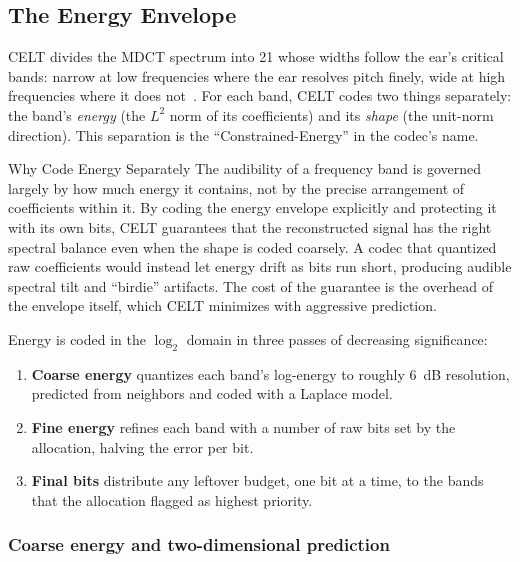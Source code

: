 \subsection{The Energy Envelope}\label{subsec:celt_energy}

CELT divides the MDCT spectrum into 21  whose widths follow the
ear's critical bands: narrow at low frequencies where the ear resolves pitch
finely, wide at high frequencies where it does not~\cite{zwicker1999psychoacoustics}.
For each band, CELT codes two things separately: the band's \emph{energy} (the
$L^2$ norm of its coefficients) and its \emph{shape} (the unit-norm direction).
This separation is the ``Constrained-Energy'' in the codec's name.

\begin{concept}{Why Code Energy Separately}
  The audibility of a frequency band is governed largely by how much energy it
  contains, not by the precise arrangement of coefficients within it. By coding
  the energy envelope explicitly and protecting it with its own bits, CELT
  guarantees that the reconstructed signal has the right spectral balance even
  when the shape is coded coarsely. A codec that quantized raw coefficients would
  instead let energy drift as bits run short, producing audible spectral tilt and
  ``birdie'' artifacts. The cost of the guarantee is the overhead of the envelope
  itself, which CELT minimizes with aggressive prediction.
\end{concept}

Energy is coded in the $\log_2$ domain in three passes of decreasing
significance:

\begin{enumerate}[itemsep=3pt]
  \item \textbf{Coarse energy} quantizes each band's log-energy to roughly 6~dB
    resolution, predicted from neighbors and coded with a Laplace model.
  \item \textbf{Fine energy} refines each band with a number of raw bits set by
    the allocation, halving the error per bit.
  \item \textbf{Final bits} distribute any leftover budget, one bit at a time,
    to the bands that the allocation flagged as highest priority.
\end{enumerate}

\subsubsection{Coarse energy and two-dimensional prediction}

